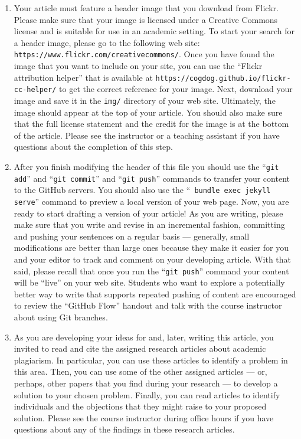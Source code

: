 \begin{enumerate}
  \item Your article must feature a header image that you download from Flickr. Please make sure that your image is
    licensed under a Creative Commons license and is suitable for use in an academic setting. To start your search for a
    header image, please go to the following web site: {\tt https://www.flickr.com/creativecommons/}. Once you have
    found the image that you want to include on your site, you can use the ``Flickr attribution helper'' that is
    available at {\tt https://cogdog.github.io/flickr-cc-helper/} to get the correct reference for your image. Next,
    download your image and save it in the {\tt img/} directory of your web site. Ultimately, the image should appear at
    the top of your article. You should also make sure that the full license statement and the credit for the image is
    at the bottom of the article. Please see the instructor or a teaching assistant if you have questions about the
    completion of this step.

  \item After you finish modifying the header of this file you should use the ``{\tt git add}'' and ``{\tt git commit}''
    and ``{\tt git push}'' commands to transfer your content to the GitHub servers. You should also use the ``{\tt
    bundle exec jekyll serve}'' command to preview a local version of your web page. Now, you are ready to start
    drafting a version of your article! As you are writing, please make sure that you write and revise in an incremental
    fashion, committing and pushing your sentences on a regular basis --- generally, small modifications are better than
    large ones because they make it easier for you and your editor to track and comment on your developing article. With
    that said, please recall that once you run the ``{\tt git push}'' command your content will be ``live'' on your web
    site. Students who want to explore a potentially better way to write that supports repeated pushing of content are
    encouraged to review the ``GitHub Flow'' handout and talk with the course instructor about using Git branches.

  \item As you are developing your ideas for and, later, writing this article, you invited to read and cite the assigned
    research articles about academic plagiarism. In particular, you can use these articles to identify a problem in this
    area. Then, you can use some of the other assigned articles --- or, perhaps, other papers that you find during your
    research --- to develop a solution to your chosen problem. Finally, you can read articles to identify individuals
    and the objections that they might raise to your proposed solution. Please see the course instructor during office
    hours if you have questions about any of the findings in these research articles.


\end{enumerate}
